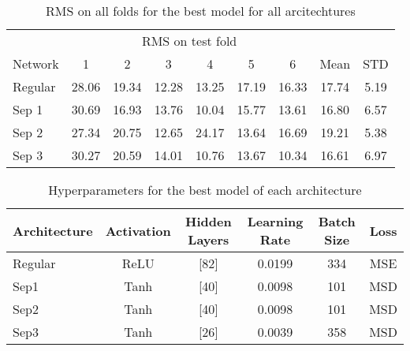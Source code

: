     
\begin{table}[!htbp]
    \centering
    \caption{RMS on all folds for the best model for all arcitechtures}
    \begin{tabular}{lcccccccc}
        \toprule
        & \multicolumn{6}{c}{RMS on test fold} & & \\
        \cmidrule(lr){2-7}
        Network & 1 & 2 & 3 & 4 & 5 & 6 & Mean & STD\\
        \midrule
        Regular & 28.06 & 19.34 & 12.28 & 13.25 & 17.19 & 16.33 & 17.74 & 5.19 \\
        Sep 1 & 30.69 & 16.93 & 13.76 & 10.04 & 15.77 & 13.61 & 16.80 & 6.57 \\
        Sep 2 & 27.34 & 20.75 & 12.65 & 24.17 & 13.64 & 16.69 & 19.21 & 5.38 \\
        Sep 3 & 30.27 & 20.59 & 14.01 & 10.76 & 13.67 & 10.34 & 16.61 & 6.97 \\
        \bottomrule
    \end{tabular}
\end{table}



\begin{table}[!htbp]
    \centering
    \caption{Hyperparameters for the best model of each architecture}
    \begin{tabular}{lccccc}
        \toprule
        Architecture & Activation & Hidden Layers & Learning Rate & Batch Size & Loss \\
        \midrule
        Regular &  ReLU & [82] & 0.0199 & 334 & MSE \\
        Sep1    &  Tanh & [40] & 0.0098 & 101 & MSD \\
        Sep2    &  Tanh & [40] & 0.0098 & 101 & MSD \\
        Sep3    &  Tanh & [26] & 0.0039 & 358 & MSD \\
        \bottomrule
    \end{tabular}
\end{table}




